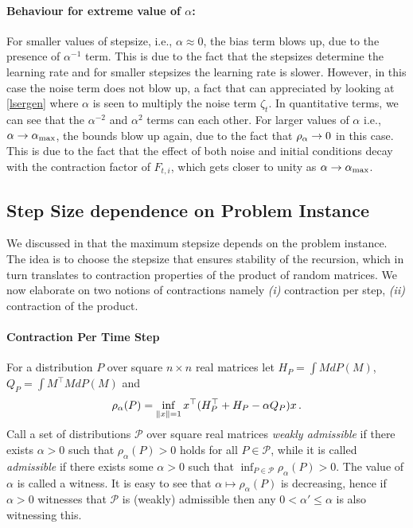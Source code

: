 \paragraph{Behaviour for extreme value of $\alpha$:} For smaller values of stepsize, i.e., $\alpha\approx 0$, the bias term blows up, due to the presence of $\alpha^{-1}$ term. This is due to the fact that the stepsizes determine the learning rate and for smaller stepsizes the learning rate is slower. However, in this case the noise term does not blow up, a fact that can appreciated by looking at \eqref{lsergen} where $\alpha$ is seen to multiply the noise term $\zeta_t$. In quantitative terms, we can see that the $\alpha^{-2}$ and $\alpha^2$ terms can each other. For larger values of $\alpha$ i.e., $\alpha\rightarrow \alpha_{\max}$, the bounds blow up again, due to the fact that $\rho_{\alpha}\rightarrow 0$ in this case. This is due to the fact that the effect of both noise and initial conditions decay with the contraction factor of $F_{t,i}$, which gets closer to unity as $\alpha\rightarrow\alpha_{\max}$.


\subsection{Step Size dependence on Problem Instance}
\label{sec:stepprob}
We discussed in  that the maximum stepsize depends on the problem instance. The idea is to choose the stepsize that ensures stability of the recursion, which in turn translates to contraction properties of the product of random matrices. We now elaborate on two notions of contractions namely 
\emph{(i)} contraction per step, \emph{(ii)} contraction of the product.

\paragraph{Contraction Per Time Step}
For a distribution $P$ over square $n\times n$ real matrices let $H_P = \int M dP(M)$, $Q_P = \int M^\top M dP(M)$ and
\begin{align*}
\rho_\alpha(P) = \inf_{\left\| x\right\|=1} x^\top (H_P^\top + H_P - \alpha Q_P) x\,.
\end{align*}
\newcommand{\cP}{\mathcal{P}}
Call a set of distributions $\cP$ over square real matrices 
\emph{weakly admissible} if there exists $\alpha>0$ such that 
$\rho_\alpha(P)>0$ holds for all $P\in \cP$,
while it is called \emph{admissible} 
if there exists some $\alpha>0$ such that $\inf_{P\in \cP} \rho_\alpha(P)>0$. 
The value of $\alpha$ is called a witness. 
It is easy to see that $\alpha \mapsto \rho_\alpha(P)$ is decreasing, 
hence if $\alpha>0$ witnesses that $\cP$ is (weakly) admissible 
then any $0<\alpha'\le \alpha$ is also witnessing this.

